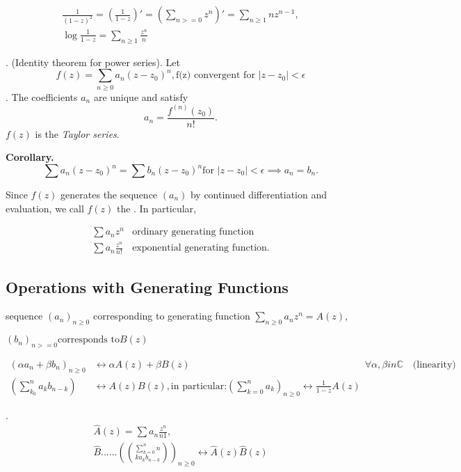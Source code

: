 \begin{gather*}
    \frac1{(1-z)^2}
    = (\frac1{1-z})'
    = (\sum_{n>=0} z^n)'
    = \sum_{n≥1} n z^{n-1}, \\
    \log\frac{1}{1-z} = \sum_{n≥1} \frac{z^n}{n}
\end{gather*}

\Theorem. (Identity theorem for power series).
Let
\[
    f(z) = \sum_{n≥0} a_n (z-z_0)^n,
    \text{f(z) convergent for $|z-z_0| < \epsilon$}
\].
The coefficients $a_n$ are unique and satisfy
\[
    a_n = \frac{f^{(n)}(z_0)}{n!}.
\]
$f(z)$ is the \emph{Taylor series}.

\textbf{Corollary.}
\[
    \sum a_n (z-z_0)^n =
    \sum b_n (z-z_0)^n
    \text{for $|z-z_0| < \epsilon$}
    \implies
    a_n = b_n.
\]

Since $f(z)$ generates the sequence $(a_n)$ by continued differentiation and evaluation, we call $f(z)$ the . In particular,

\begin{align*}
\sum a_n z^n & \text{ordinary generating function} \\
\sum a_n \frac{z^n}{n!} & \text{exponential generating function.}
\end{align*}


\subsection*{Operations with Generating Functions}

sequence $(a_n)_{n≥0}$ corresponding to generating function
$\sum_{n≥0} a_n z^n = A(z)$,

$(b_n)_{n>=0} \text{corresponds to} B(z)$

\begin{align*}
    (\alpha a_n + \beta b_n)_{n≥0}
        &↔ \alpha A(z) + \beta B(z)
        &&\forall \alpha, \beta in \mathbb{C}
        \quad\text{(linearity)} \\
    (\sum_{k_0}^{n} a_k b_{n-k} )
        &↔ A(z) B(z),
        \text{in particular:}
        (\sum_{k=0}^n a_k)_{n≥0} ↔ \frac{1}{1-z} A(z)
\end{align*}

\Remark.
\begin{align*}
    \hat{A}(z) = \sum a_n \frac{z^n}{n1}, \\
    \hat{B} ...
    ...
    (\sum_{k=0}^n n\choose k a_k b_{n-k})_{n≥0}
        ↔ \hat A(z)\hat B(z)
\end{align*}

